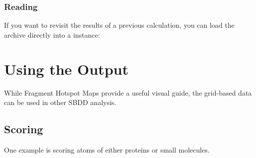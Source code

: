 \documentclass[letterpaper,10pt,english]{sphinxmanual}
\begin{document}
\begin{sphinxVerbatim}[commandchars=\\\{\}]
   

  

     
\end{sphinxVerbatim}


\subsubsection{Reading}
\label{\detokenize{tutorial:reading}}
If you want to revisit the results of a previous calculation, you can load the  archive directly into a
 instance:

\begin{sphinxVerbatim}[commandchars=\\\{\}]
   

  
\end{sphinxVerbatim}


\section{Using the Output}
\label{\detokenize{tutorial:using-the-output}}
While Fragment Hotspot Maps provide a useful visual guide, the grid-based data can be used in other SBDD analysis.


\subsection{Scoring}
\label{\detokenize{tutorial:scoring}}
One example is scoring atoms of either proteins or small molecules.
\end{document}
